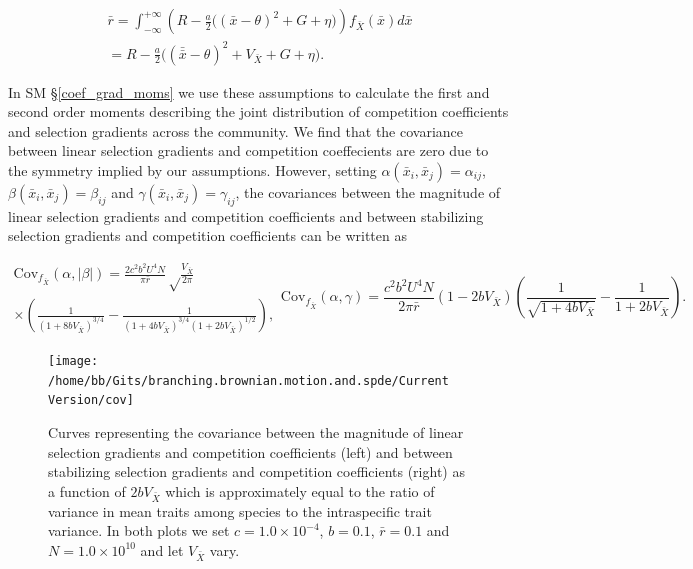 \documentclass[]{elsarticle} %
\begin{document}
\begin{multline}
\bar r=\int_{-\infty}^{+\infty}\left(R-\frac{a}{2}\Big((\bar x-\theta)^2+G+\eta\Big)\right)f_{\bar X}(\bar x)d\bar x \\
=R-\frac{a}{2}\Big((\bar{\bar x}-\theta)^2+V_{\bar X}+G+\eta\Big).
\end{multline}

In SM \S\ref{coef_grad_moms} we use these assumptions to calculate the
first and second order moments describing the joint distribution of
competition coefficients and selection gradients across the community.
We find that the covariance between linear selection gradients and
competition coeffecients are zero due to the symmetry implied by our
assumptions. However, setting \(\alpha(\bar x_i,\bar x_j)=\alpha_{ij}\),
\(\beta(\bar x_i,\bar x_j)=\beta_{ij}\) and
\(\gamma(\bar x_i,\bar x_j)=\gamma_{ij}\), the covariances between the
magnitude of linear selection gradients and competition coefficients and
between stabilizing selection gradients and competition coefficients can
be written as

\begin{subequations}\label{cov_eqns}
\begin{multline}\label{cov_alpha_beta}
\mathrm{Cov}_{f_{\bar X}}(\alpha,|\beta|)=\frac{2c^2b^2U^4N}{\pi\bar r}\sqrt\frac{V_{\bar X}}{2\pi} \\
\times\left(\frac{1}{(1+8bV_{\bar X})^{3/4}}-\frac{1}{(1+4bV_{\bar X})^{3/4}(1+2bV_{\bar X})^{1/2}}\right),
\end{multline}
\begin{equation}\label{cov_alpha_gamma}
\mathrm{Cov}_{f_{\bar X}}(\alpha,\gamma)=\frac{c^2b^2U^4N}{2\pi\bar r}(1-2bV_{\bar X})\left(\frac{1}{\sqrt{1+4bV_{\bar X}}}-\frac{1}{1+2bV_{\bar X}}\right).
\end{equation}
\end{subequations}

\begin{figure}

{\centering \texttt{[image: /home/bb/Gits/branching.brownian.motion.and.spde/Current Version/cov]} 

}

\caption{\label{cov_fig}Curves representing the covariance between the magnitude of linear selection gradients and competition coefficients (left) and between stabilizing selection gradients and competition coefficients (right) as a function of $2bV_{\bar X}$ which is approximately equal to the ratio of variance in mean traits among species to the intraspecific trait variance. In both plots we set $c=1.0\times10^{-4}$, $b=0.1$, $\bar r=0.1$ and $N=1.0\times10^{10}$ and let $V_{\bar X}$ vary.}\label{fig:unnamed-chunk-10}
\end{figure}
\end{document}

